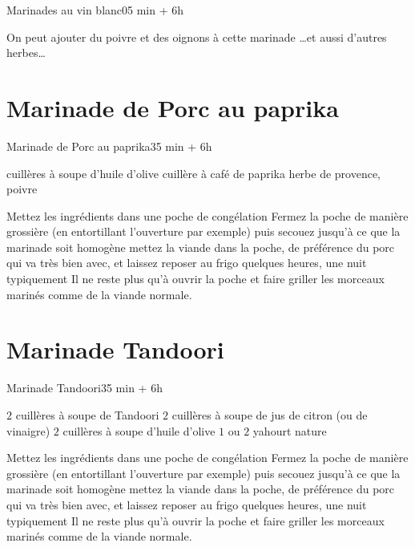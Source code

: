 {\begin{recette}{Marinades au vin blanc}{0}{5 min + 6h}{}
\begin{remarque}
On peut ajouter du poivre et des oignons à cette marinade \dots  et aussi d'autres herbes\dots
\end{remarque}
\end{recette}

\section{Marinade de Porc au paprika}
\begin{recette}{Marinade de Porc au paprika}{3}{5 min + 6h}{}
\begin{ingredients}
 cuillères à soupe d'huile d'olive
 cuillère à café de paprika
\ingredient herbe de provence, poivre
\end{ingredients}

\begin{preparation}
\etape Mettez les ingrédients dans une poche de congélation
\etape Fermez la poche de manière grossière (en entortillant l'ouverture par exemple) puis secouez jusqu'à ce que la marinade 
soit homogène
\etape mettez la viande dans la poche, de préférence du porc qui va très bien avec, et laissez reposer au frigo quelques heures, 
une nuit typiquement
\etape Il ne reste plus qu'à ouvrir la poche et faire griller les morceaux marinés comme de la viande normale.
\end{preparation}

\end{recette}

\section{Marinade Tandoori}
\begin{recette}{Marinade Tandoori}{3}{5 min + 6h}{}
\begin{ingredients}
\ingredient $2$ cuillères à soupe de Tandoori
\ingredient $2$ cuillères à soupe de jus de citron (ou de vinaigre)
\ingredient $2$ cuillères à soupe d'huile d'olive
\ingredient $1$ ou $2$ yahourt nature
\end{ingredients}

\begin{preparation}
\etape Mettez les ingrédients dans une poche de congélation
\etape Fermez la poche de manière grossière (en entortillant l'ouverture par exemple) puis secouez jusqu'à ce que la marinade 
soit homogène
\etape mettez la viande dans la poche, de préférence du porc qui va très bien avec, et laissez reposer au frigo quelques heures, 
une nuit typiquement
\etape Il ne reste plus qu'à ouvrir la poche et faire griller les morceaux marinés comme de la viande normale.
\end{preparation}


\end{recette}}
